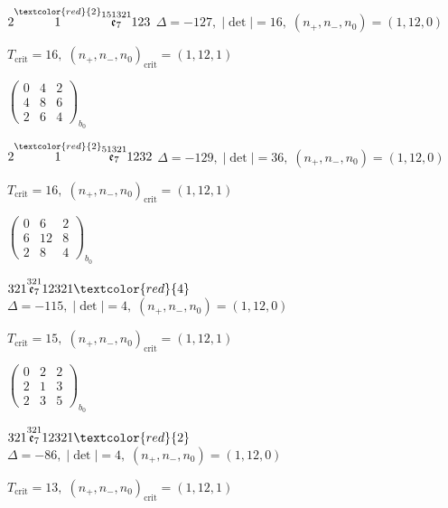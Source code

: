 \documentclass[10pt]{article}
\begin{document}
\smallskip

$2\overset{\textcolor{red}{2}}{1}\overset{151321}{\mathfrak{e}_7}123$ \quad $\Delta=-127,\; |\det|=16,\; (n_+,n_-,n_0)=(1,12,0)$

\hspace{1em}$T_{\text{crit}}=16,\; (n_+,n_-,n_0)_{\text{crit}}=(1,12,1)$

\hspace{2em}$\left(\begin{smallmatrix}0 & 4 & 2 \\ 4 & 8 & 6 \\ 2 & 6 & 4\end{smallmatrix}\right)_{\!b_0}$

\smallskip

$2\overset{\textcolor{red}{2}}{1}\overset{51321}{\mathfrak{e}_7}1232$ \quad $\Delta=-129,\; |\det|=36,\; (n_+,n_-,n_0)=(1,12,0)$

\hspace{1em}$T_{\text{crit}}=16,\; (n_+,n_-,n_0)_{\text{crit}}=(1,12,1)$

\hspace{2em}$\left(\begin{smallmatrix}0 & 6 & 2 \\ 6 & 12 & 8 \\ 2 & 8 & 4\end{smallmatrix}\right)_{\!b_0}$

\smallskip

$321\overset{321}{\mathfrak{e}_7}12321\textcolor{red}{4}$ \quad $\Delta=-115,\; |\det|=4,\; (n_+,n_-,n_0)=(1,12,0)$

\hspace{1em}$T_{\text{crit}}=15,\; (n_+,n_-,n_0)_{\text{crit}}=(1,12,1)$

\hspace{2em}$\left(\begin{smallmatrix}0 & 2 & 2 \\ 2 & 1 & 3 \\ 2 & 3 & 5\end{smallmatrix}\right)_{\!b_0}$

$321\overset{321}{\mathfrak{e}_7}12321\textcolor{red}{2}$ \quad $\Delta=-86,\; |\det|=4,\; (n_+,n_-,n_0)=(1,12,0)$

\hspace{1em}$T_{\text{crit}}=13,\; (n_+,n_-,n_0)_{\text{crit}}=(1,12,1)$
\end{document}

